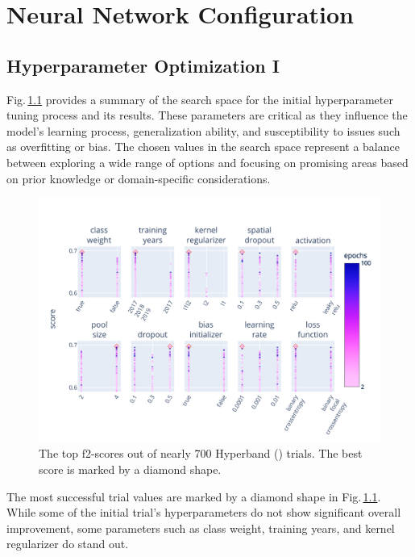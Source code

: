 \chapter{Neural Network Configuration}
\label{chapter:hyper}
\section{Hyperparameter Optimization I}

Fig.\,\ref{fig:hyperband_resnet_params} provides a summary of the search space for the initial hyperparameter tuning process and its results. These parameters are critical as they influence the model's learning process, generalization ability, and susceptibility to issues such as overfitting or bias. The chosen values in the search space represent a balance between exploring a wide range of options and focusing on promising areas based on prior knowledge or domain-specific considerations.

\begin{figure}[ht]
    \centering
    \includegraphics[width=0.9\linewidth, trim={10pt 10pt 15pt 40pt}, clip]{figures/figures_tuner/hyperband_resnet_params.pdf}
    \caption{The top f2-scores out of nearly 700 Hyperband (\cite{hyperband}) trials. The best score is marked by a diamond shape.}
    \label{fig:hyperband_resnet_params}
\end{figure}

The most successful trial values are marked by a diamond shape in Fig.\,\ref{fig:hyperband_resnet_params}. While some of the initial trial's hyperparameters do not show significant overall improvement, some parameters such as class weight, training years, and kernel regularizer do stand out. 

